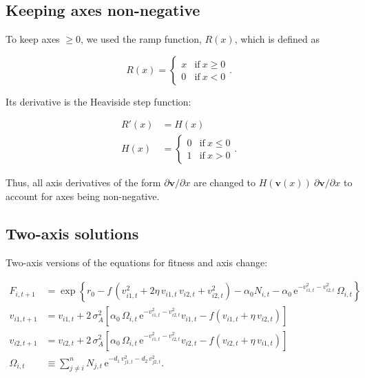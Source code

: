 \subsection*{Keeping axes non-negative}

To keep axes $\ge 0$, we used the ramp function, $R(x)$, which is defined as

\begin{equation*}
    R(x) = \begin{cases}
        x & \text{if}\ x \ge 0 \\
        0 & \text{if}\ x < 0
        \end{cases}
    \text{.}
\end{equation*}


\noindent Its derivative is the Heaviside step function:

\begin{equation*}
\begin{split}
    R'(x) &= H(x) \\
    H(x) &= \begin{cases}
        0 & \text{if}\ x \le 0 \\
        1 & \text{if}\ x > 0
        \end{cases}
    \text{.}
\end{split}
\end{equation*}


Thus, all axis derivatives of the form $\partial \mathbf{v} / \partial x$
are changed to $H(\mathbf{v}(x)) \: \partial \mathbf{v} / \partial x$ to 
account for axes being non-negative.



\subsection*{Two-axis solutions}

Two-axis versions of the equations for fitness and axis change:

\begin{equation}
\label{eq:2-axis-equations}
\begin{split}
    F_{i,t+1} &= \exp\left\{
        r_0 - f \, \left( v_{i1,t}^2 + 2 \eta \, v_{i1,t} \, v_{i2,t} + v_{i2,t}^2 \right)
        - \alpha_0 N_{i,t} - \alpha_0 \, \text{e}^{-v_{i1,t}^2 - v_{i2,t}^2} \, \Omega_{i,t}
        \right\} \\
    v_{i1,t+1} &= v_{i1,t} + 2 \, \sigma_A^2 \left[
            \alpha_0 \, \Omega_{i,t} \, \text{e}^{-v_{i1,t}^2 - v_{i2,t}^2} v_{i1,t} - f \left( v_{i1,t} + \eta \, v_{i2,t} \right) 
        \right] \\
    v_{i2,t+1} &= v_{i2,t} + 2 \, \sigma_A^2 \left[
            \alpha_0 \, \Omega_{i,t} \, \text{e}^{-v_{i1,t}^2 - v_{i2,t}^2} v_{i2,t} - f \left( v_{i2,t} + \eta \, v_{i1,t} \right) 
        \right] \\
    \Omega_{i,t} &\equiv \sum_{j \ne i}^{n}{ N_{j,t} \, 
        \text{e}^{ -d_1 \, v_{j1,t}^2 - d_2 \, v_{j2,t}^2 } }
    \text{.}
\end{split}
\end{equation}

